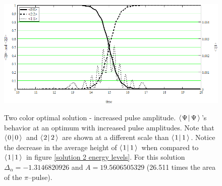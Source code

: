 \begin{figure}
\centering
\includegraphics[width=5.00in]
{solution_2-stronger_energy_levels/solution_2-stronger_energy_levels.png}\\
\caption[Two color optimal solution - increased pulse amplitude]{Two color optimal solution - increased pulse amplitude. $\braket{\Psi}{\Psi}$'s behavior at an optimum with increased pulse amplitudes. Note that $\braket{0}{0}$ and $\braket{2}{2}$ are shown at a different scale than $\braket{1}{1}$. Notice the decrease in the average height of $\braket{1}{1}$ when compared to $\braket{1}{1}$ in figure \ref{solution 2 energy levels}. For this solution $\Delta_{\alpha}=-1.3146820926$ and $A=19.5606505329$ (26.511 times the area of the $\pi$--pulse).}
\label{solution 2-stronger energy levels}
\end{figure} 
